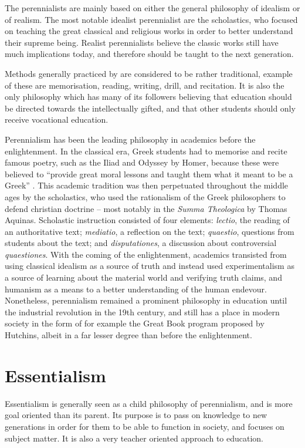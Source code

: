 The perennialists are mainly based on either the general philosophy of idealism or of realism. The most notable idealist perennialist are the scholastics, who focused on teaching the great classical and religious works in order to better understand their supreme being. Realist perennialists believe the classic works still have much implications today, and therefore should be taught to the next generation.

Methods generally practiced by are considered to be rather traditional, example of these are memorisation, reading, writing, drill, and recitation. It is also the only philosophy which has many of its followers believing that education should be directed towards the intellectually gifted, and that other students should only receive vocational education.

Perennialism has been the leading philosophy in academics before the enlightenment. In the classical era, Greek students had to memorise and recite famous poetry, such as the Iliad and Odyssey by Homer, because these were believed to ``provide great moral lessons and taught them what it meant to be a Greek'' \cite[p.139]{searchgreeks}. This academic tradition was then perpetuated throughout the middle ages by the scholastics, who used the rationalism of the Greek philosophers to defend christian doctrine -- most notably in the \emph{Summa Theologica} by Thomas Aquinas. Scholastic instruction consisted of four elements: \emph{lectio}, the reading of an authoritative text; \emph{mediatio}, a reflection on the text; \emph{quaestio}, questions from students about the text; and \emph{disputationes}, a discussion about controversial \emph{quaestiones}. With the coming of the enlightenment, academics transisted from using classical idealism as a source of truth and instead used experimentalism as a source of learning about the material world and verifying truth claims, and humanism as a means to a better understanding of the human endevour. Nonetheless, perennialism remained a prominent philosophy in education until the industrial revolution in the 19th century, and still has a place in modern society in the form of for example the Great Book program proposed by Hutchins, albeit in a far lesser degree than before the enlightenment.

\section{Essentialism}

Essentialism is generally seen as a child philosophy of perennialism, and is more goal oriented than its parent. Its purpose is to pass on knowledge to new generations in order for them to be able to function in society, and focuses on subject matter. It is also a very teacher oriented approach to education.

